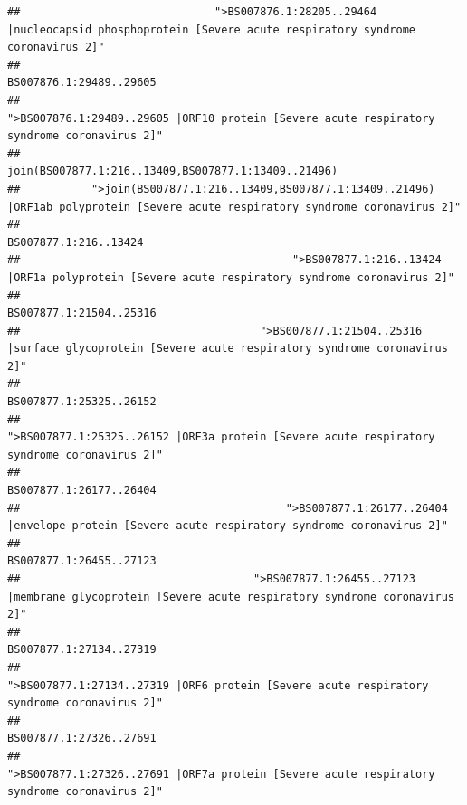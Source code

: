 \documentclass[
]{article}
\begin{document}
\begin{verbatim}
##                              ">BS007876.1:28205..29464 |nucleocapsid phosphoprotein [Severe acute respiratory syndrome coronavirus 2]" 
##                                                                                                                BS007876.1:29489..29605 
##                                            ">BS007876.1:29489..29605 |ORF10 protein [Severe acute respiratory syndrome coronavirus 2]" 
##                                                                                    join(BS007877.1:216..13409,BS007877.1:13409..21496) 
##           ">join(BS007877.1:216..13409,BS007877.1:13409..21496) |ORF1ab polyprotein [Severe acute respiratory syndrome coronavirus 2]" 
##                                                                                                                  BS007877.1:216..13424 
##                                          ">BS007877.1:216..13424 |ORF1a polyprotein [Severe acute respiratory syndrome coronavirus 2]" 
##                                                                                                                BS007877.1:21504..25316 
##                                     ">BS007877.1:21504..25316 |surface glycoprotein [Severe acute respiratory syndrome coronavirus 2]" 
##                                                                                                                BS007877.1:25325..26152 
##                                            ">BS007877.1:25325..26152 |ORF3a protein [Severe acute respiratory syndrome coronavirus 2]" 
##                                                                                                                BS007877.1:26177..26404 
##                                         ">BS007877.1:26177..26404 |envelope protein [Severe acute respiratory syndrome coronavirus 2]" 
##                                                                                                                BS007877.1:26455..27123 
##                                    ">BS007877.1:26455..27123 |membrane glycoprotein [Severe acute respiratory syndrome coronavirus 2]" 
##                                                                                                                BS007877.1:27134..27319 
##                                             ">BS007877.1:27134..27319 |ORF6 protein [Severe acute respiratory syndrome coronavirus 2]" 
##                                                                                                                BS007877.1:27326..27691 
##                                            ">BS007877.1:27326..27691 |ORF7a protein [Severe acute respiratory syndrome coronavirus 2]" 

\end{verbatim}
\end{document}
